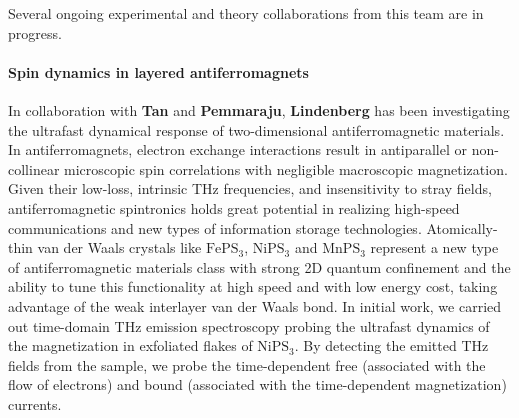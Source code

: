 Several ongoing experimental and theory collaborations from this team are in progress.

\paragraph{Spin dynamics in layered antiferromagnets}\label{sec:2dafm}

In collaboration with {\bf Tan} and {\bf Pemmaraju}, {\bf Lindenberg} has been investigating the ultrafast dynamical response of two-dimensional antiferromagnetic materials.
In antiferromagnets, electron exchange interactions result in antiparallel or non-collinear microscopic spin correlations with negligible macroscopic magnetization.
Given their low-loss, intrinsic THz frequencies, and insensitivity to stray fields, antiferromagnetic spintronics holds great potential in realizing high-speed communications and new types of information storage technologies. 
Atomically-thin van der Waals crystals like \(\mathrm{FePS_3}\), \(\mathrm{NiPS_3}\) and \(\mathrm{MnPS_3}\) represent a new type of antiferromagnetic materials class with strong 2D quantum confinement and the ability to tune this functionality at high speed and with low energy cost, taking advantage of the weak interlayer van der Waals bond.
In initial work, we carried out time-domain THz emission spectroscopy probing the ultrafast dynamics of the magnetization in exfoliated flakes of \(\mathrm{NiPS_3}\).
By detecting the emitted THz fields from the sample, we probe the time-dependent free (associated with the flow of electrons) and bound (associated with the time-dependent magnetization) currents.

